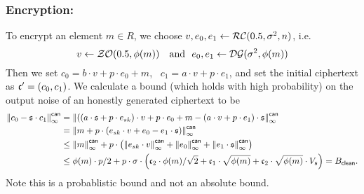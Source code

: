 \subsubsection{Encryption:}
To encrypt an element $m\in R$, we choose $v, e_0, e_1 \leftarrow \mathcal{RC}(0.5,\sigma^2,n)$, i.e.
\[
v \leftarrow \mathcal{ZO}(0.5, \phi(m)) ~~~\mbox{and}~~ e_0,e_1 \leftarrow \mathcal{DG}(\sigma^2,\phi(m)) 
\]
Then we set $c_0 = b \cdot v + p \cdot e_0+m$,~ $c_1=a\cdot v+p\cdot
e_1$, and set the initial ciphertext as $\mathfrak{c}'=(c_0,c_1)$.
We calculate a bound (which holds with high probability) on the output noise of
an honestly generated ciphertext to be
\begin{align*}
  {\Vert c_0 - \mathfrak{s}\cdot c_1 \Vert}_\infty^{\mathsf{can}} 
     &= {\Vert ((a \cdot \mathfrak{s}+ p \cdot e_{sk}) \cdot v +p \cdot e_0 +m
                - (a \cdot v+ p \cdot e_1) \cdot \mathfrak{s}  \Vert}_\infty^{\mathsf{can}} \\
     &= {\Vert m + p \cdot (e_{sk} \cdot v +e_0 - e_1 \cdot \mathfrak{s}) \Vert}_\infty^{\mathsf{can}} \\
     &\le {\Vert m \Vert}_\infty^{\mathsf{can}} 
         +p \cdot \left( {\Vert e_{sk} \cdot v \Vert}_\infty^{\mathsf{can}}
                       + {\Vert e_0 \Vert}_\infty^{\mathsf{can}}
                       + {\Vert e_1 \cdot \mathfrak{s} \Vert}_\infty^{\mathsf{can}}
                  \right) \\
     &\le \phi(m) \cdot p/2
	  + p \cdot \sigma \cdot 
             \left( \mathfrak{c}_2 \cdot \phi(m) / \sqrt{2}
			  + \mathfrak{c}_1 \cdot \sqrt{\phi(m)}
			  + \mathfrak{c}_2 \cdot \sqrt{\phi(m)} \cdot V_{\mathfrak{s}}
		    \right) = B_{\mathsf{clean}}.
\end{align*}
Note this is a probablistic bound and not an absolute bound.

\vspace{5mm}

